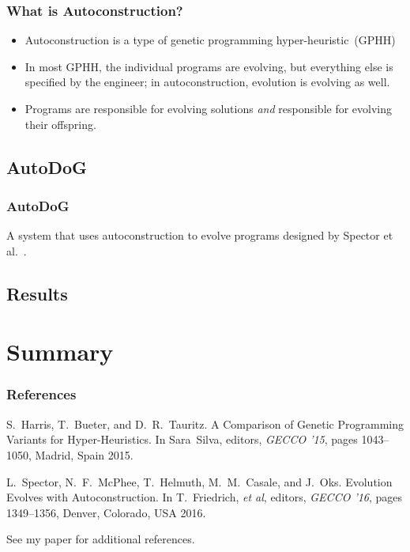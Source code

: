 \documentclass{beamer}
\newcommand{\linespace}{\vskip 0.25cm}
\begin{document}
\begin{frame}
	\frametitle{What is Autoconstruction?}
	\begin{itemize}
		\item Autoconstruction is a type of genetic programming hyper-heuristic~(GPHH)
		\linespace
		\pause
		\item In most GPHH, the individual programs are evolving, but everything else is specified by the engineer; in autoconstruction, evolution is evolving as well.
		\linespace
		\pause
		\item Programs are responsible for evolving solutions \textit{and} responsible for evolving their offspring.
	\end{itemize}
\end{frame}

\subsection{AutoDoG}

\begin{frame}
	\frametitle{AutoDoG}
	A system that uses autoconstruction to evolve programs designed by Spector et al.~\cite{spector:2016}.
	
\end{frame}

\subsection{Results}

\section[Summary]{Summary}

\begin{frame} 
	\frametitle{References} 
	
	\begin{thebibliography}{lskdjf}
		
		S.~Harris, T.~Bueter, and D.~R.~Tauritz.
		\newblock A Comparison of Genetic Programming Variants for Hyper-Heuristics.
		\newblock In Sara~Silva, editors, {\em GECCO '15}, pages 1043--1050, Madrid, Spain 2015.
		
		L.~Spector, N.~F.~McPhee, T.~Helmuth, M.~M.~Casale, and J.~Oks.
		\newblock Evolution Evolves with Autoconstruction.
		\newblock In T.~Friedrich, \emph{et al}, editors, {\em GECCO '16}, pages 1349--1356, Denver, Colorado, USA 2016.
		
	\end{thebibliography}
	
	\linespace
	\begin{center}
		See my paper for additional references.
	\end{center}
\end{frame} 
\end{document}
